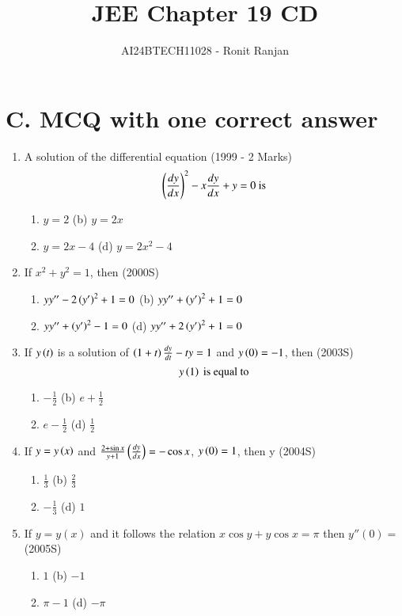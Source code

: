 \documentclass[journal,12pt,twocolumn]{IEEEtran}
\theoremstyle{remark}
\begin{document}

\vspace{3cm}

\title{JEE Chapter 19 CD}
\author{AI24BTECH11028 - Ronit Ranjan}
\maketitle
\newpage
\bigskip
\section*{C. MCQ with one correct answer}
\begin{enumerate}
\item A solution of the differential equation \hfill (1999 - 2 Marks)
\[
\left(\frac{dy}{dx}\right)^2 - x \frac{dy}{dx} + y = 0 \text{ is}
\]
\begin{enumerate}[label=(\alph*)]
    \item $y = 2$ \quad \quad \quad \quad (b) $y = 2x$
    \item $y = 2x - 4$ \quad \quad (d) $y = 2x^2 - 4$
\end{enumerate}
\item If $x^2 + y^2 = 1$, then \hfill (2000S)
\begin{enumerate}[label=(\alph*)]
    \item $yy'' - 2\left(y'\right)^2 + 1 = 0$ \quad \quad (b) $yy'' + \left(y'\right)^2 + 1 = 0$
    \item $yy'' + \left(y'\right)^2 - 1 = 0$ \quad (d) $yy'' + 2\left(y'\right)^2 + 1 = 0$
\end{enumerate}
\item If $y\left(t\right)$ is a solution of $\left(1 + t\right) \frac{dy}{dt} - ty = 1$ and $y\left(0\right) = -1$, then \hfill (2003S)
\[
y\left(1\right) \text{ is equal to}
\]
\begin{enumerate}[label=(\alph*)]
    \item $-\frac{1}{2}$ \quad \quad \quad \quad (b) $e + \frac{1}{2}$
    \item $e - \frac{1}{2}$ \quad \quad \quad (d) $\frac{1}{2}$
\end{enumerate}

\item If $y = y\left(x\right)$ and $\frac{2 + \sin x}{y + 1}\left(\frac{dy}{dx}\right) = -\cos x$, $y\left(0\right) = 1$, then y \hfill (2004S)

\begin{enumerate}[label=(\alph*)]
    \item $\frac{1}{3}$ \quad \quad \quad (b) $\frac{2}{3}$
    \item $-\frac{1}{3}$ \quad \quad (d) $1$
\end{enumerate}
\item If $y = y(x)$ and it follows the relation $x \cos y + y \cos x = \pi$ then $y''(0) =$ \hfill (2005S)
\begin{enumerate}[label=(\alph*)]
    \item $1$ \quad \quad \quad (b) $-1$
    \item $\pi - 1$ \quad \quad (d) $-\pi$
\end{enumerate}


\end{enumerate}
\end{document}
